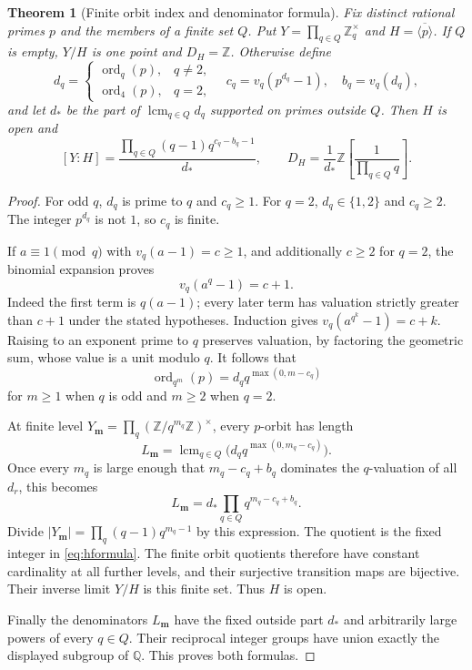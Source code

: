 \documentclass[11pt]{article}
\newcommand{\Z}{\mathbb Z}
\newcommand{\Q}{\mathbb Q}
\newcommand{\ord}{\operatorname{ord}}
\newcommand{\lcm}{\operatorname{lcm}}
\newtheorem{theorem}{Theorem}[section]
\theoremstyle{definition}
\theoremstyle{remark}
\begin{document}
\begin{theorem}[Finite orbit index and denominator formula]\label{thm:indices}
Fix distinct rational primes $p$ and the members of a finite set $Q$. Put $Y=\prod_{q\in Q}\Z_q^\times$ and $H=\overline{\langle p\rangle}$. If $Q$ is empty, $Y/H$ is one point and $D_H=\Z$. Otherwise define
\[
 d_q=\begin{cases}\ord_q(p),&q\ne2,\\ \ord_4(p),&q=2,\end{cases}
 \quad c_q=v_q(p^{d_q}-1),\quad b_q=v_q(d_q),
\]
and let $d_*$ be the part of $\lcm_{q\in Q}d_q$ supported on primes outside $Q$. Then $H$ is open and
\begin{equation}\label{eq:hformula}
 [Y:H]=\frac{\prod_{q\in Q}(q-1)q^{c_q-b_q-1}}{d_*},
 \qquad
 D_H=\frac1{d_*}\Z\left[\frac1{\prod_{q\in Q}q}\right].
\end{equation}
\end{theorem}
\begin{proof}
For odd $q$, $d_q$ is prime to $q$ and $c_q\geq1$. For $q=2$, $d_q\in\{1,2\}$ and $c_q\geq2$. The integer $p^{d_q}$ is not $1$, so $c_q$ is finite.

If $a\equiv1\pmod q$ with $v_q(a-1)=c\geq1$, and additionally $c\geq2$ for $q=2$, the binomial expansion proves
\[
 v_q(a^q-1)=c+1.
\]
Indeed the first term is $q(a-1)$; every later term has valuation strictly greater than $c+1$ under the stated hypotheses. Induction gives $v_q(a^{q^k}-1)=c+k$. Raising to an exponent prime to $q$ preserves valuation, by factoring the geometric sum, whose value is a unit modulo $q$. It follows that
\begin{equation}\label{eq:orderformula}
 \ord_{q^m}(p)=d_q q^{\max(0,m-c_q)}
\end{equation}
for $m\geq1$ when $q$ is odd and $m\geq2$ when $q=2$.

At finite level $Y_{\boldsymbol m}=\prod_q(\Z/q^{m_q}\Z)^\times$, every $p$-orbit has length
\[
 L_{\boldsymbol m}=\lcm_{q\in Q}\bigl(d_qq^{\max(0,m_q-c_q)}\bigr).
\]
Once every $m_q$ is large enough that $m_q-c_q+b_q$ dominates the $q$-valuation of all $d_r$, this becomes
\[
 L_{\boldsymbol m}=d_*\prod_{q\in Q}q^{m_q-c_q+b_q}.
\]
Divide $|Y_{\boldsymbol m}|=\prod_q(q-1)q^{m_q-1}$ by this expression. The quotient is the fixed integer in \eqref{eq:hformula}. The finite orbit quotients therefore have constant cardinality at all further levels, and their surjective transition maps are bijective. Their inverse limit $Y/H$ is this finite set. Thus $H$ is open.

Finally the denominators $L_{\boldsymbol m}$ have the fixed outside part $d_*$ and arbitrarily large powers of every $q\in Q$. Their reciprocal integer groups have union exactly the displayed subgroup of $\Q$. This proves both formulas.
\end{proof}
\end{document}
